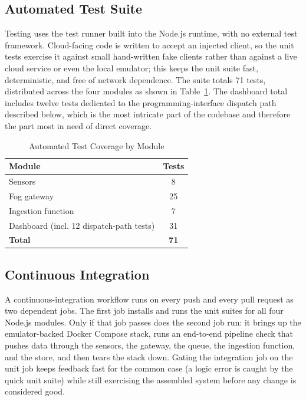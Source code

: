 \documentclass[conference]{IEEEtran}
\begin{document}
\subsection{Automated Test Suite}

Testing uses the test runner built into the Node.js runtime, with no external test framework. Cloud-facing code is written to accept an injected client, so the unit tests exercise it against small hand-written fake clients rather than against a live cloud service or even the local emulator; this keeps the unit suite fast, deterministic, and free of network dependence. The suite totals 71 tests, distributed across the four modules as shown in Table~\ref{tab:tests}. The dashboard total includes twelve tests dedicated to the programming-interface dispatch path described below, which is the most intricate part of the codebase and therefore the part most in need of direct coverage.

\begin{table}[!t]
\caption{Automated Test Coverage by Module}
\label{tab:tests}
\centering
\renewcommand{\arraystretch}{1.3}
\begin{tabular}{@{}lc@{}}
\toprule
\textbf{Module} & \textbf{Tests} \\
\midrule
Sensors & 8 \\
Fog gateway & 25 \\
Ingestion function & 7 \\
Dashboard (incl. 12 dispatch-path tests) & 31 \\
\midrule
\textbf{Total} & \textbf{71} \\
\bottomrule
\end{tabular}
\end{table}

\subsection{Continuous Integration}

A continuous-integration workflow runs on every push and every pull request as two dependent jobs. The first job installs and runs the unit suites for all four Node.js modules. Only if that job passes does the second job run: it brings up the emulator-backed Docker Compose stack, runs an end-to-end pipeline check that pushes data through the sensors, the gateway, the queue, the ingestion function, and the store, and then tears the stack down. Gating the integration job on the unit job keeps feedback fast for the common case (a logic error is caught by the quick unit suite) while still exercising the assembled system before any change is considered good.
\end{document}
